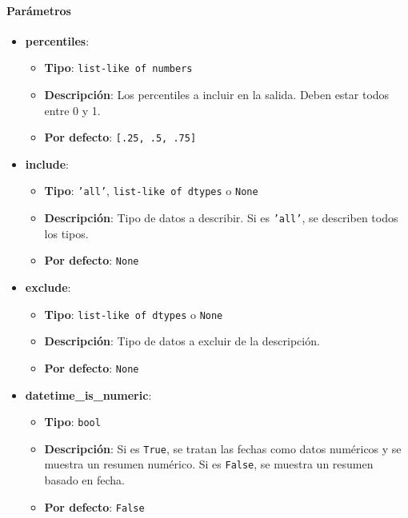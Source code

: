     \paragraph{Parámetros}

    \begin{itemize}
        \item \textbf{percentiles}:
            \begin{itemize}
                \item \textbf{Tipo}: \texttt{list-like of numbers}
                \item \textbf{Descripción}: Los percentiles a incluir en la salida. Deben estar todos entre 0 y 1.
                \item \textbf{Por defecto}: \texttt{[.25, .5, .75]}
            \end{itemize}

        \item \textbf{include}:
            \begin{itemize}
                \item \textbf{Tipo}: \texttt{'all'}, \texttt{list-like of dtypes} o \texttt{None}
                \item \textbf{Descripción}: Tipo de datos a describir. Si es \texttt{'all'}, se describen todos los tipos.
                \item \textbf{Por defecto}: \texttt{None}
            \end{itemize}

        \item \textbf{exclude}:
            \begin{itemize}
                \item \textbf{Tipo}: \texttt{list-like of dtypes} o \texttt{None}
                \item \textbf{Descripción}: Tipo de datos a excluir de la descripción.
                \item \textbf{Por defecto}: \texttt{None}
            \end{itemize}

        \item \textbf{datetime\_is\_numeric}:
            \begin{itemize}
                \item \textbf{Tipo}: \texttt{bool}
                \item \textbf{Descripción}: Si es \texttt{True}, se tratan las fechas como datos numéricos y se muestra un resumen numérico. Si es \texttt{False}, se muestra un resumen basado en fecha.
                \item \textbf{Por defecto}: \texttt{False}
            \end{itemize}
    \end{itemize}

